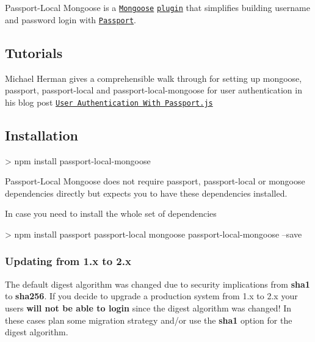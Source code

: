 Passport-\/\+Local Mongoose is a \href{http://mongoosejs.com/}{\tt Mongoose} \href{http://mongoosejs.com/docs/plugins.html}{\tt plugin} that simplifies building username and password login with \href{http://passportjs.org}{\tt Passport}.

\href{https://travis-ci.org/saintedlama/passport-local-mongoose}{\tt } \href{https://coveralls.io/r/saintedlama/passport-local-mongoose?branch=master}{\tt } \href{https://app.codellama.io/repositories/5a04399c1b4c363a0f9427f8}{\tt }

\subsection*{Tutorials}

Michael Herman gives a comprehensible walk through for setting up mongoose, passport, passport-\/local and passport-\/local-\/mongoose for user authentication in his blog post \href{http://mherman.org/blog/2013/11/11/user-authentication-with-passport-dot-js/}{\tt User Authentication With Passport.\+js}

\subsection*{Installation}


\begin{DoxyCode}
> npm install passport-local-mongoose
\end{DoxyCode}


Passport-\/\+Local Mongoose does not require {\ttfamily passport}, {\ttfamily passport-\/local} or {\ttfamily mongoose} dependencies directly but expects you to have these dependencies installed.

In case you need to install the whole set of dependencies


\begin{DoxyCode}
> npm install passport passport-local mongoose passport-local-mongoose --save
\end{DoxyCode}


\subsubsection*{Updating from 1.\+x to 2.\+x}

The default digest algorithm was changed due to security implications from {\bfseries sha1} to {\bfseries sha256}. If you decide to upgrade a production system from 1.\+x to 2.\+x your users {\bfseries will not be able to login} since the digest algorithm was changed! In these cases plan some migration strategy and/or use the {\bfseries sha1} option for the digest algorithm.

